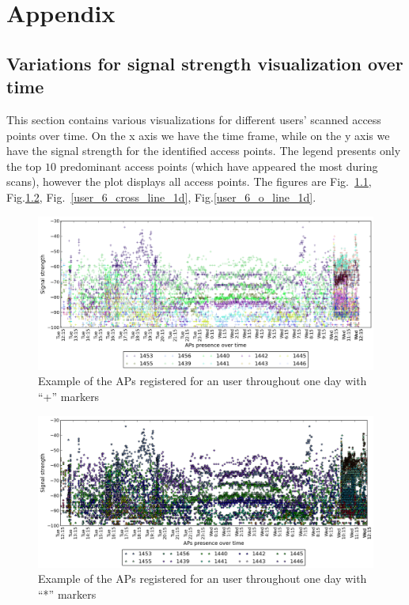 \chapter{Appendix}

\section{Variations for signal strength visualization over time}
\label{appendix_signal_strength}

This section contains various visualizations for different users' scanned access
points over time. On the x axis we have the time frame, while on the y axis we
have the signal strength for the identified access points. The legend presents
only the top $10$ predominant access points (which have appeared the most
during scans), however the plot displays all access points. The figures are
Fig.~\ref{user_6_cross_1d}, Fig.\ref{user_6_star_1d},
Fig.~\ref{user_6_cross_line_1d}, Fig.\ref{user_6_o_line_1d}.

\begin{figure}[h]
\centering
\includegraphics[height =
0.45\textwidth]{figures/cros_user_6_sorted_1days_plot.png}
\caption{Example of the APs registered for an user throughout one day with
``+'' markers}
\label{user_6_cross_1d}
\end{figure}

\begin{figure}[h]
\centering
\includegraphics[height =
0.45\textwidth]{figures/star_user_6_sorted_1days_plot.png}
\caption{Example of the APs registered for an user throughout one day with
``*'' markers}
\label{user_6_star_1d}
\end{figure}

